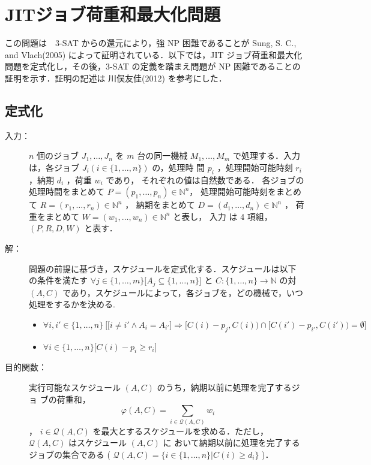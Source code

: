 \documentclass[12pt]{optlab-bachelor}
\begin{document}
\section{JITジョブ荷重和最大化問題}
この問題は　3-SAT からの還元により，強 NP 困難であることが Sung, S. C., and Vlach(2005) \cite{JIT}
によって証明されている．以下では，JIT ジョブ荷重和最大化問題を定式化し，その後，3-SAT の定義を踏まえ問題が NP 困難であることの証明を示す．証明の記述は 川俣友佳(2012)\cite{kawamata}
を参考にした．
\subsection{定式化}
\begin{description}
  \item[入力：] $n$ 個のジョブ $J_1,\ldots,J_n$ を $m$ 台の同一機械 $M_1,\ldots,M_m$
  で処理する．入力は，各ジョブ $J_i ( i \in \{1,\ldots,n\} )$ の，処理時
  間 $p_i$ ，処理開始可能時刻 $r_i$ ，納期 $d_i$ ，荷重 $w_i$ であり，
  それぞれの値は自然数である．
  各ジョブの処理時間をまとめて $P = (p_1,\ldots,p_n) \in \mathbb{N}^n$，
  処理開始可能時刻をまとめて $R = (r_1,\ldots,r_n) \in \mathbb{N}^n$ ，
  納期をまとめて $D = (d_1,\ldots,d_n) \in \mathbb{N}^n$ ，
  荷重をまとめて $W = (w_1,\ldots,w_n) \in \mathbb{N}^n$ と表し，
  入力 は 4 項組，$(P,R,D,W)$ と表す．
  \item[解：] 問題の前提に基づき，スケジュールを定式化する．スケジュールは以下
  の条件を満たす $\forall j \in \{1,\ldots,m\}\big[A_j \subseteq
  \{1,\ldots,n\}\big]$ と $C : \{1,\ldots,n\} \to \mathbb{N}$ の対 $(A,
  C)$ であり，スケジュールによって，各ジョブを，どの機械で，いつ処理をするかを決める.
  \begin{itemize}
    \item $\forall i, i' \in \{1,\ldots,n\}\ \Big[ \big[i \neq i' \land A_i =
    A_{i'}\big] \Rightarrow [C(i) - p_j, C(i)) \cap [C(i') - p_{i'}, C(i')) = \emptyset \Big]$
    \item  $\forall i \in \{1,\ldots,n\}\big[C(i) - p_i \ge r_i\big]$
  \end{itemize}
  \item[目的関数：] 実行可能なスケジュール $(A, C)$ のうち，納期以前に処理を完了するジョ
  ブの荷重和，
  $$\displaystyle \varphi(A,C) = \sum_{i \in \mathcal{Q}(A,C)}w_i$$，
  $i \in \mathcal{Q}(A,C)$ を最大とするスケジュールを求める．ただし，
  $\mathcal{Q}(A, C)$ はスケジュール $(A, C)$ に
  おいて納期以前に処理を完了するジョブの集合である (
  $\mathcal{Q}(A, C) = \{i \in \{1,\ldots, n\} | C(i) \ge d_i \}$ )．
\end{description}
\end{document}
